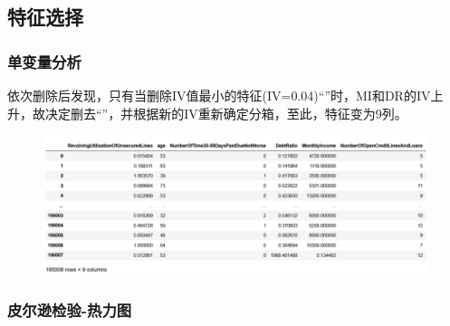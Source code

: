 \documentclass[12pt]{article}
\begin{document}
\newpage
\subsection{特征选择}

\subsubsection{单变量分析}
\begin{flushleft}
	\noindent\qquad 依次删除后发现，只有当删除IV值最小的特征(IV=0.04)“”时，MI和DR的IV上升，故决定删去“”，并根据新的IV重新确定分箱，至此，特征变为9列。
	
	
\end{flushleft}
\begin{figure}[H]
	\centering
	\includegraphics[width=1\linewidth]{figures/screenshot007}
	\caption{}
\end{figure}
\newpage
\subsubsection{皮尔逊检验-热力图}
\end{document}
